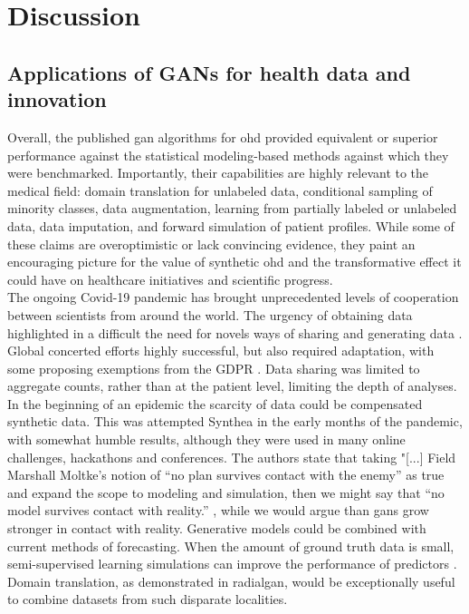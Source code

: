\section{Discussion}
\subsection{Applications of GANs for health data and innovation}

Overall, the published \gls{gan} algorithms for \gls{ohd} provided equivalent or superior performance against the statistical modeling-based methods against which they were benchmarked. Importantly, their capabilities are highly relevant to the medical field: domain translation for unlabeled data, conditional sampling of minority classes, data augmentation, learning from partially labeled or unlabeled data, data imputation, and forward simulation of patient profiles. While some of these claims are overoptimistic or lack convincing evidence, they paint an encouraging picture for the value of synthetic \gls{ohd} and the transformative effect it could have on healthcare initiatives and scientific progress.\\

The ongoing Covid-19 pandemic has brought unprecedented levels of cooperation between scientists from around the world. The urgency of obtaining data highlighted in a difficult the need for novels ways of sharing and generating data \cite{bandara_improving_2020, Cosgriff_2020}. Global concerted efforts highly successful, but also required adaptation, with some proposing exemptions from the GDPR \cite{mclennan_covid-19_2020}. Data sharing was limited to aggregate counts, rather than at the patient level, limiting the depth of analyses. In the beginning of an epidemic the scarcity of data could be compensated synthetic data. This was attempted Synthea \cite{Walonoski_2017} in the early months of the pandemic, with somewhat humble results, although they were used in many online challenges, hackathons and conferences. The authors state that taking "[...] Field Marshall Moltke’s notion of “no plan survives contact with the enemy” as true and expand the scope to modeling and simulation, then we might say that “no model survives contact with reality.” \cite{walonoski_synthea_2020}, while we would argue than \glspl{gan} grow stronger in contact with reality. Generative models could be combined with current methods of forecasting. When the amount of ground truth data is small, semi-supervised learning simulations can improve the performance of predictors \cite{dahmen_synsys_2019}. Domain translation, as demonstrated in \gls{radialgan}, would be exceptionally useful to combine datasets from such disparate localities.

